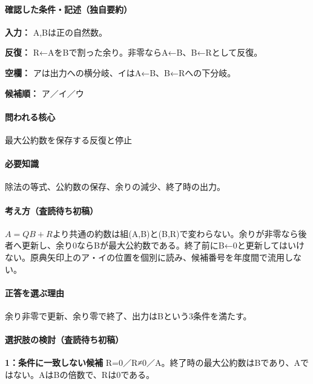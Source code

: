 \paragraph{確認した条件・記述（独自要約）}\mbox{}\par

\noindent\textbf{入力：} A,Bは正の自然数。\par

\noindent\textbf{反復：} R←AをBで割った余り。非零ならA←B、B←Rとして反復。\par

\noindent\textbf{空欄：} アは出力への横分岐、イはA←B、B←Rへの下分岐。\par

\noindent\textbf{候補順：} ア／イ／ウ\par

\paragraph{問われる核心} 最大公約数を保存する反復と停止

\paragraph{必要知識} 除法の等式、公約数の保存、余りの減少、終了時の出力。

\paragraph{考え方（査読待ち初稿）} \(A=QB+R\)より共通の約数は組(A,B)と(B,R)で変わらない。余りが非零なら後者へ更新し、余り0ならBが最大公約数である。終了前にB←0と更新してはいけない。原典矢印上のア・イの位置を個別に読み、候補番号を年度間で流用しない。

\paragraph{正答を選ぶ理由} 余り非零で更新、余り零で終了、出力はBという3条件を満たす。

\paragraph{選択肢の検討（査読待ち初稿）}\mbox{}\par

\noindent\textbf{1：条件に一致しない候補} R=\allowbreak{}0／R≠0／A。終了時の最大公約数はBであり、Aではない。AはBの倍数で、Rは0である。\par

